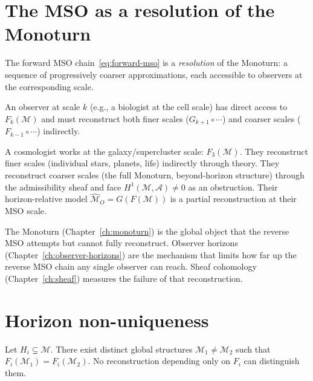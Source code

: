 \section{The MSO as a resolution of the Monoturn}

\begin{definition}
  The forward MSO chain~\eqref{eq:forward-mso} is a
  \emph{resolution} of the Monoturn: a sequence of
  progressively coarser approximations, each accessible
  to observers at the corresponding scale.
\end{definition}

\begin{proposition}
  \label{prop:observers-in-mso}
  An observer at scale $k$ (e.g., a biologist at the cell scale)
  has direct access to $F_k(\mathcal{M})$ and must reconstruct
  both finer scales ($G_{k+1} \circ \cdots$) and coarser scales
  ($F_{k-1} \circ \cdots$) indirectly.
\end{proposition}

\begin{WorkedExample}
  A cosmologist works at the galaxy/supercluster scale:
  $F_3(\mathcal{M})$.
  They reconstruct finer scales (individual stars, planets,
  life) indirectly through theory.
  They reconstruct coarser scales (the full Monoturn,
  beyond-horizon structure) through the admissibility sheaf
  and face $H^1(\mathcal{M},\mathcal{A}) \neq 0$ as an
  obstruction.
  Their horizon-relative model
  $\widehat{\mathcal{M}}_O = G(F(\mathcal{M}))$
  is a partial reconstruction at their MSO scale.
\end{WorkedExample}

\begin{ForwardRef}
  The Monoturn (Chapter~\ref{ch:monoturn}) is the global object
  that the reverse MSO attempts but cannot fully reconstruct.
  Observer horizons (Chapter~\ref{ch:observer-horizons})
  are the mechanism that limits how far up the reverse MSO
  chain any single observer can reach.
  Sheaf cohomology (Chapter~\ref{ch:sheaf}) measures the
  failure of that reconstruction.
\end{ForwardRef}

\section{Horizon non-uniqueness}

\begin{theorem}
  \label{thm:horizon-nonunique}
  \statusproven{}
  Let $H_i \subsetneq \mathcal{M}$.
  There exist distinct global structures $\mathcal{M}_1 \neq \mathcal{M}_2$
  such that $F_i(\mathcal{M}_1) = F_i(\mathcal{M}_2)$.
  No reconstruction depending only on $F_i$ can distinguish them.
\end{theorem}

